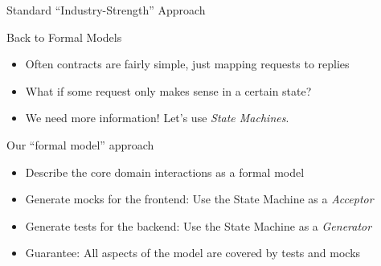 \begin{frame}[fragile]{Standard ``Industry-Strength'' Approach}


\end{frame}

\begin{frame}[fragile]{Back to Formal Models}
  \begin{itemize}[<+->]
  \item Often contracts are fairly simple, just mapping requests to replies
  \item What if some request only makes sense in a certain state?

  \item We need more information! Let's use \emph{State Machines}.
  \end{itemize}
\end{frame}


\begin{frame}[fragile]{Our ``formal model'' approach}

\begin{itemize}[<+->]
\item Describe the core domain interactions as a formal model
\item Generate mocks for the frontend: Use the State Machine as a \emph{Acceptor}
\item Generate tests for the backend: Use the State Machine as a \emph{Generator}

\item Guarantee: All aspects of  the model are covered by tests and mocks
\end{itemize}

\end{frame}


